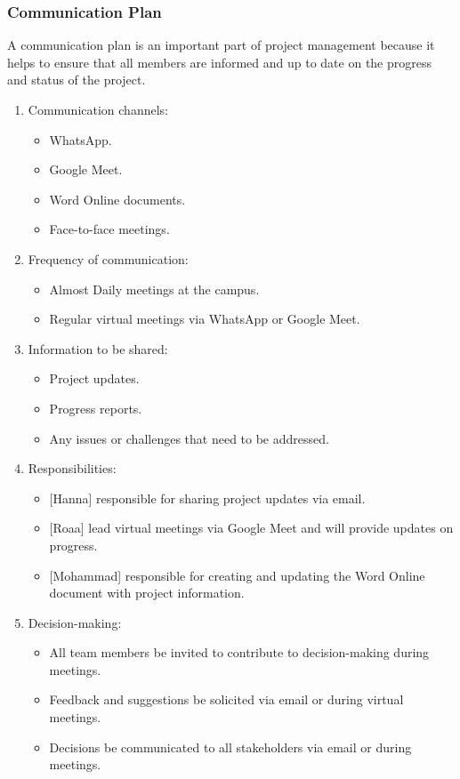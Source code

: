 \documentclass[12pt]{article}
\begin{document}
				\subsubsection{Communication Plan}
				\quad A communication plan is an important part of project management because it helps to ensure that all members are informed and up to date on the progress and status of the project.
					\begin{enumerate}
						\item Communication channels:
							\begin{itemize}
								\item WhatsApp.
								\item Google Meet.
								\item Word Online documents.
								\item Face-to-face meetings.
							\end{itemize}
						\item Frequency of communication:
						\begin{itemize}
							\item Almost Daily meetings at the campus.
							\item Regular virtual meetings via WhatsApp or Google Meet.
						\end{itemize}
						\item Information to be shared:
							\begin{itemize}
								\item Project updates.
								\item Progress reports.
								\item Any issues or challenges that need to be addressed.
							\end{itemize}
						\item Responsibilities:
							\begin{itemize}
								\item {[Hanna]} responsible for sharing project updates via email.
								\item {[Roaa]} lead virtual meetings via Google Meet and will provide updates on progress.
								\item {[Mohammad]} responsible for creating and updating the Word Online document with project information.
							\end{itemize}
						\item Decision-making:
							\begin{itemize}
								\item All team members be invited to contribute to decision-making during meetings.
								\item Feedback and suggestions be solicited via email or during virtual meetings.
								\item Decisions be communicated to all stakeholders via email or during meetings.
							\end{itemize}
					\end{enumerate}
\end{document}
